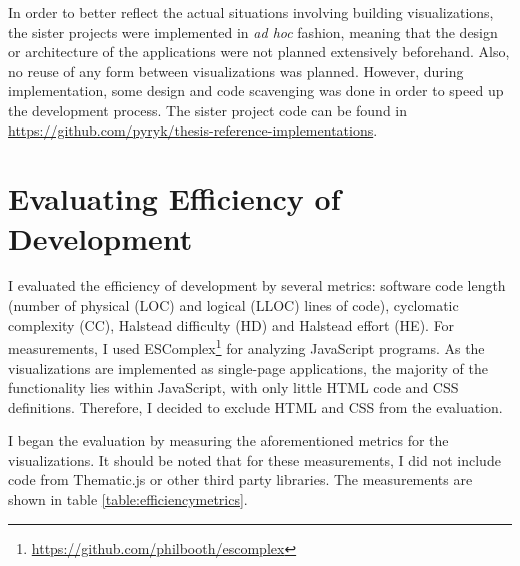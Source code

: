 In order to better reflect the actual situations involving building visualizations, the sister projects were implemented in \emph{ad hoc} fashion, meaning that the design or architecture of the applications were not planned extensively beforehand. Also, no reuse of any form between visualizations was planned. However, during implementation, some design and code scavenging was done in order to speed up the development process. The sister project code can be found in \url{https://github.com/pyryk/thesis-reference-implementations}.

\section{Evaluating Efficiency of Development}
\label{section:evaluatingefficiency}

I evaluated the efficiency of development by several metrics: software code length (number of physical (LOC) and logical (LLOC) lines of code), cyclomatic complexity (CC), Halstead difficulty (HD) and Halstead effort (HE). For measurements, I used ESComplex\footnote{\url{https://github.com/philbooth/escomplex}} for analyzing JavaScript programs. As the visualizations are implemented as single-page applications, the majority of the functionality lies within JavaScript, with only little HTML code and CSS definitions. Therefore, I decided to exclude HTML and CSS from the evaluation.

I began the evaluation by measuring the aforementioned metrics for the visualizations. It should be noted that for these measurements, I did not include code from Thematic.js or other third party libraries. The measurements are shown in table \ref{table:efficiencymetrics}.


